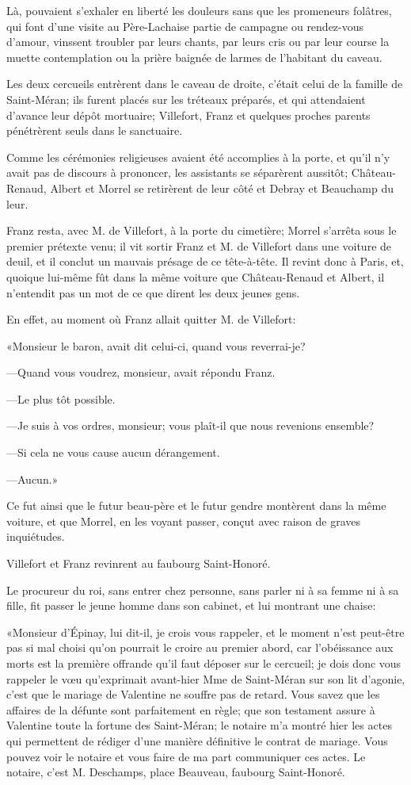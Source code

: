 Là, pouvaient s'exhaler en liberté les douleurs sans que les promeneurs folâtres, qui font d'une visite au Père-Lachaise partie de campagne ou rendez-vous d'amour, vinssent troubler par leurs chants, par leurs cris ou par leur course la muette contemplation ou la prière baignée de larmes de l'habitant du caveau. 

Les deux cercueils entrèrent dans le caveau de droite, c'était celui de la famille de Saint-Méran; ils furent placés sur les tréteaux préparés, et qui attendaient d'avance leur dépôt mortuaire; Villefort, Franz et quelques proches parents pénétrèrent seuls dans le sanctuaire. 

Comme les cérémonies religieuses avaient été accomplies à la porte, et qu'il n'y avait pas de discours à prononcer, les assistants se séparèrent aussitôt; Château-Renaud, Albert et Morrel se retirèrent de leur côté et Debray et Beauchamp du leur. 

Franz resta, avec M. de Villefort, à la porte du cimetière; Morrel s'arrêta sous le premier prétexte venu; il vit sortir Franz et M. de Villefort dans une voiture de deuil, et il conclut un mauvais présage de ce tête-à-tête. Il revint donc à Paris, et, quoique lui-même fût dans la même voiture que Château-Renaud et Albert, il n'entendit pas un mot de ce que dirent les deux jeunes gens. 

En effet, au moment où Franz allait quitter M. de Villefort: 

«Monsieur le baron, avait dit celui-ci, quand vous reverrai-je? 

—Quand vous voudrez, monsieur, avait répondu Franz. 

—Le plus tôt possible. 

—Je suis à vos ordres, monsieur; vous plaît-il que nous revenions ensemble? 

—Si cela ne vous cause aucun dérangement. 

—Aucun.»  

Ce fut ainsi que le futur beau-père et le futur gendre montèrent dans la même voiture, et que Morrel, en les voyant passer, conçut avec raison de graves inquiétudes. 

Villefort et Franz revinrent au faubourg Saint-Honoré. 

Le procureur du roi, sans entrer chez personne, sans parler ni à sa femme ni à sa fille, fit passer le jeune homme dans son cabinet, et lui montrant une chaise: 

«Monsieur d'Épinay, lui dit-il, je crois vous rappeler, et le moment n'est peut-être pas si mal choisi qu'on pourrait le croire au premier abord, car l'obéissance aux morts est la première offrande qu'il faut déposer sur le cercueil; je dois donc vous rappeler le vœu qu'exprimait avant-hier Mme de Saint-Méran sur son lit d'agonie, c'est que le mariage de Valentine ne souffre pas de retard. Vous savez que les affaires de la défunte sont parfaitement en règle; que son testament assure à Valentine toute la fortune des Saint-Méran; le notaire m'a montré hier les actes qui permettent de rédiger d'une manière définitive le contrat de mariage. Vous pouvez voir le notaire et vous faire de ma part communiquer ces actes. Le notaire, c'est M. Deschamps, place Beauveau, faubourg Saint-Honoré. 

